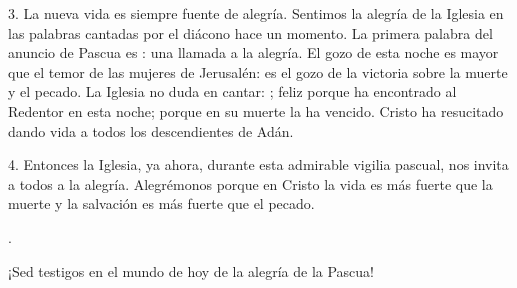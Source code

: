 \begin{body}

3. La nueva vida es siempre fuente de alegría. Sentimos la alegría de la Iglesia en las palabras cantadas por el diácono hace un momento. La primera palabra del anuncio de Pascua es : una llamada a la alegría. El gozo de esta noche es mayor que el temor de las mujeres de Jerusalén: es el gozo de la victoria sobre la muerte y el pecado. La Iglesia no duda en cantar: ; feliz porque ha encontrado al Redentor en esta noche; porque en su muerte la ha vencido. Cristo ha resucitado dando vida a todos los descendientes de Adán. 

4. Entonces la Iglesia, ya ahora, durante esta admirable vigilia pascual, nos invita a todos a la alegría. Alegrémonos porque en Cristo la vida es más fuerte que la muerte y la salvación es más fuerte que el pecado.

. 

¡Sed testigos en el mundo de hoy de la alegría de la Pascua!
\end{body}

